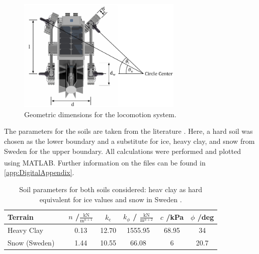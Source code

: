 \begin{figure}[htb]
{\centering
\includegraphics[width=0.7\textwidth]{Media/Geometries}
\caption{Geometric dimensions for the locomotion system.}
\label{fig:Ackerman}
}
\end{figure}

The parameters for the soils are taken from the literature \cite{Bekker}. Here, a hard soil was chosen as the lower boundary and a substitute for ice, heavy clay, and snow from Sweden for the upper boundary. All calculations were performed and plotted using MATLAB\textsuperscript{\textregistered}. Further information on the files can be found in \autoref{app:DigitalAppendix}.    
     
\begin{table}[htb]
     \centering
     \caption{Soil parameters for both soils considered: heav clay as hard equivalent for ice values and snow in Sweden \cite{Bekker}.}
     \begin{adjustbox}{max width=\textwidth}
     \begin{tabular}[l]{lcccccc}
     
     	\toprule
     		\multicolumn{1}{l}{Terrain} & \qquad \qquad	& \multicolumn{1}{c}{\(n\) /\(\frac{\text{kN}}{\text{m}^{n+1}}\)} & \multicolumn{1}{c}{\(k_\text{c}\)} & \multicolumn{1}{c}{\(k_\phi\) / \(\frac{\text{kN}}{\text{m}^{n+2}}\)} & \multicolumn{1}{c}{\(c\) /kPa} & \multicolumn{1}{c}{\(\phi\) /deg}  \\
      
       	\midrule
 
     Heavy Clay		&	&	0.13	&	12.70	&	1555.95		&	68.95	&	34			\\	
     Snow (Sweden)	&	&	1.44	&	10.55	&	66.08		&	6		&	20.7		\\	

     	\bottomrule
     
     \end{tabular}
     \end{adjustbox}
     \label{tab:SoilParam}
     \end{table}     


